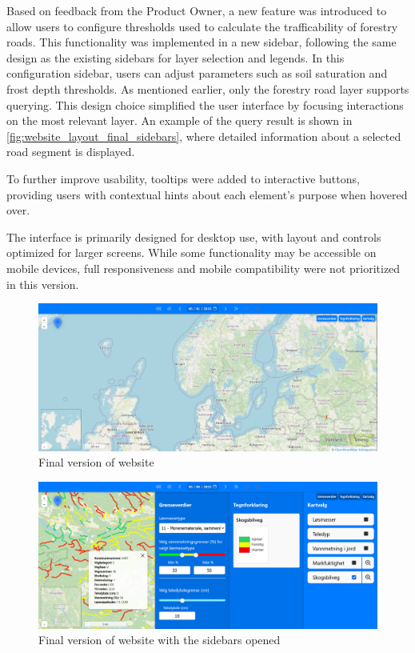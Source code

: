 Based on feedback from the Product Owner, a new feature was introduced to allow users to configure thresholds used to calculate the trafficability of forestry roads. This functionality was implemented in a new sidebar, following the same design as the existing sidebars for layer selection and legends. In this configuration sidebar, users can adjust parameters such as soil saturation and frost depth thresholds. As mentioned earlier, only the forestry road layer supports querying. This design choice simplified the user interface by focusing interactions on the most relevant layer. An example of the query result is shown in \autoref{fig:website_layout_final_sidebars}, where detailed information about a selected road segment is displayed.

To further improve usability, tooltips were added to interactive buttons, providing users with contextual hints about each element's purpose when hovered over.

The interface is primarily designed for desktop use, with layout and controls optimized for larger screens. While some functionality may be accessible on mobile devices, full responsiveness and mobile compatibility were not prioritized in this version.

\begin{figure}[h]
    \centering
    \includegraphics[width=1\linewidth]{figures/website_layout_final.pdf}
    \caption{Final version of website}
    \label{fig:website_layout_final}
\end{figure}

\begin{figure}[h]
    \centering
    \includegraphics[width=1\linewidth]{figures/website_layout_final_sidebars.png}
    \caption{Final version of website with the sidebars opened}
    \label{fig:website_layout_final_sidebars}
\end{figure}


